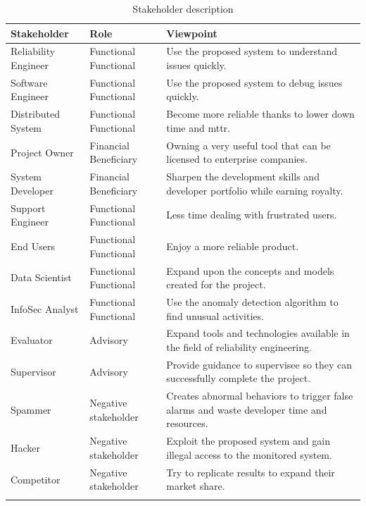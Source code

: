 \begin{longtable}{|p{35mm}|p{44mm}|p{72mm}|}
    \hline
    \textbf{Stakeholder} &
    \textbf{Role} &
    \textbf{Viewpoint} 
    \\ \hline
    
    Reliability Engineer &
    Functional Functional &
    Use the proposed system to understand issues quickly. \\ \hline
    
    Software Engineer &
    Functional Functional &
    Use the proposed system to debug issues quickly. \\ \hline
    
    Distributed System &
    Functional Functional &
    Become more reliable thanks to lower down time and \ac{mttr}. \\ \hline
    
    Project Owner &
    Financial Beneficiary &
    Owning a very useful tool that can be licensed to enterprise companies. \\ \hline
    
    System Developer &
    Financial Beneficiary &
    Sharpen the development skills and developer portfolio while earning royalty. \\ \hline
    
    Support Engineer &
    Functional Functional &
    Less time dealing with frustrated users. \\ \hline
    
    End Users &
    Functional Functional &
    Enjoy a more reliable product. \\ \hline
    
    Data Scientist &
    Functional Functional &
    Expand upon the concepts and models created for the project. \\ \hline
    
    InfoSec Analyst &
    Functional Functional &
    Use the anomaly detection algorithm to find unusual activities. \\ \hline
    
    Evaluator & 
    Advisory &
    Expand tools and technologies available in the field of reliability engineering. \\ \hline
    
    Supervisor &
    Advisory &
    Provide guidance to supervisee so they can successfully complete the project. \\ \hline
    
    Spammer &
    Negative stakeholder & Creates abnormal behaviors to trigger false alarms and waste developer time and resources. \\ \hline
    
    Hacker &
    Negative stakeholder &
    Exploit the proposed system and gain illegal access to the monitored system. \\ \hline
    
    Competitor &
    Negative stakeholder &
    Try to replicate results to expand their market share. \\ \hline
\caption{Stakeholder description}
\end{longtable}